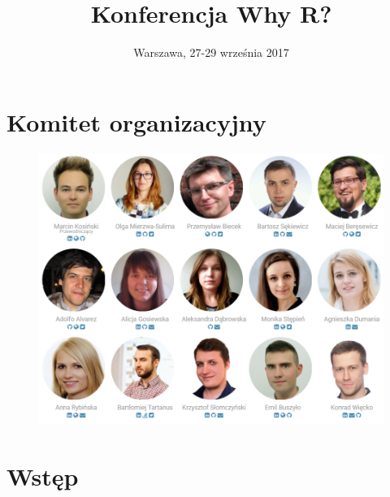 \documentclass[11pt,twoside,b5paper]{book}
\title{Konferencja Why R?}
\author{Warszawa, 27-29 września 2017}
\date{}
\begin{document}


\clearpage

\frontmatter
\maketitle

\begin{small}
\cleardoublepage
{}
\tableofcontents
\cleardoublepage
{} 
\end{small}

\mainmatter

\chapter*{Komitet organizacyjny}
\par
\begin{figure}[h!]
\includegraphics[width=\linewidth]{img/people/all.png}
\end{figure}


\chapter*{Wstęp}

\end{document}
